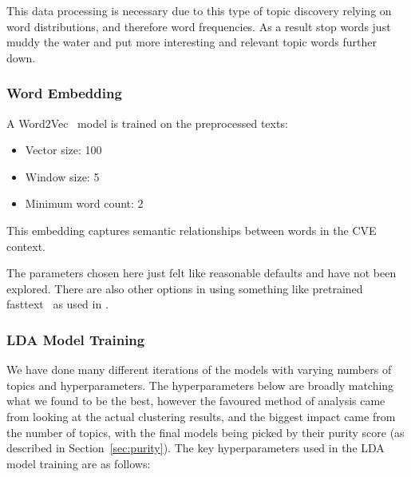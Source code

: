 This data processing is necessary due to this type of topic discovery relying on word distributions, and therefore word frequencies. As a result stop words just muddy the water and put more interesting and relevant topic words further down.


\subsubsection{Word Embedding}

A Word2Vec~\cite{word2vec} model is trained on the preprocessed texts:

\begin{itemize}
	\item Vector size: 100
	\item Window size: 5
	\item Minimum word count: 2
\end{itemize}

This embedding captures semantic relationships between words in the CVE context.

The parameters chosen here just felt like reasonable defaults and have not been explored. There are also other options in using something like pretrained fasttext~\cite{fasttext} as used in \cite{nvd_clustering_fasttext}.


\subsubsection{LDA Model Training}

We have done many different iterations of the models with varying numbers of topics and hyperparameters. The hyperparameters below are broadly matching what we found to be the best, however the favoured method of analysis came from looking at the actual clustering results, and the biggest impact came from the number of topics, with the final models being picked by their purity score (as described in Section~\ref{sec:purity}). The key hyperparameters used in the LDA model training are as follows:

